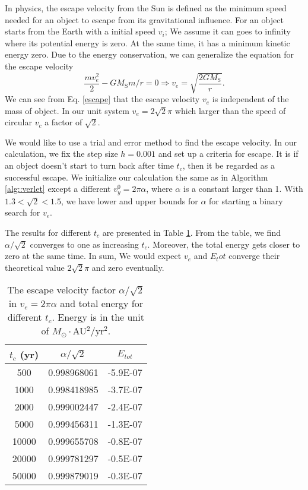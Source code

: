 In physics, the escape velocity from the Sun is defined as the minimum speed needed for an object to escape from its gravitational influence.
For an object starts from the Earth with a initial speed $v_i$; 
We assume it can goes to infinity where its potential energy is zero. 
At the same time, it has a minimum kinetic energy zero.
Due to the energy conservation, we can generalize the equation for the escape velocity
\begin{equation}
	\label{escape}
	\frac{mv_e^2}{2} - GM_{\mathrm{S}}m/r = 0\Longrightarrow v_e = \sqrt{\frac{2GM_{\mathrm{S}}}{r}}.
\end{equation}
We can see from Eq. \ref{escape} that the escape velocity $v_e$ is independent of the mass of object.
In our unit system $v_e = 2\sqrt{2}\pi$ which larger than the speed of circular $v_c$ a factor of $\sqrt{2}$.

We would like to use a trial and error method to find the escape velocity.
In our calculation, we fix the step size $h=0.001$ and set up a criteria for escape.
It is if an object doesn't start to turn back after time $t_c$, then it be regarded as a successful escape.
We initialize our calculation the same as in Algorithm \ref{alg::verlet} except a different $v_{y}^0=2\pi \alpha$, where $\alpha$ is a constant larger than 1.
With $1.3<\sqrt{2}<1.5$, we have lower and upper bounds for $\alpha$ for starting a binary search for $v_e$.

The results for different $t_c$ are presented in Table \ref{tab::escape}. 
From the table, we find $\alpha/\sqrt{2}$ converges to one as increasing $t_c$. 
Moreover, the total energy gets closer to zero at the same time.
In sum, We would expect $v_e$ and $E_tot$ converge their theoretical value $2\sqrt{2}\pi$ and zero eventually. 

\begin{table}[tb]
	\centering
	\caption{The escape velocity factor $\alpha/\sqrt{2}$ in $v_e=2\pi \alpha$ and total energy for different $t_c$.
	Energy is in the unit of $M_{\odot}\cdot$AU$^2/$yr$^2$. }
	\label{tab::escape}
	\begin{tabular}{ccc}
	\hline
	\hline
	$t_c$ (yr)  & $\alpha/\sqrt{2}$          & $E_{tot}$          \\
	\hline
	500   & 0.998968061 & -5.9E-07 \\
	1000  & 0.998418985 & -3.7E-07 \\
	2000  & 0.999002447 & -2.4E-07 \\
	5000  & 0.999456311 & -1.3E-07 \\
	10000 & 0.999655708 & -0.8E-07 \\
	20000 & 0.999781297 & -0.5E-07 \\
	50000 & 0.999879019 & -0.3E-07\\
	\hline
	\hline
	\end{tabular}
\end{table}
	

